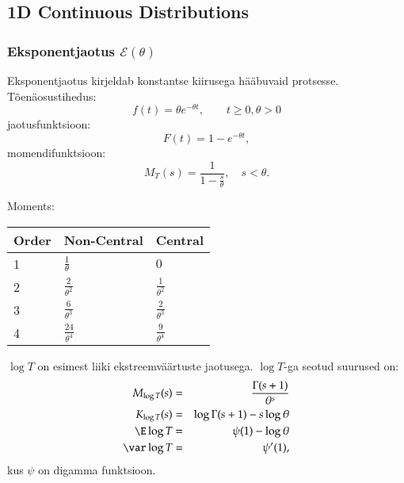 \documentclass[a4paper]{article}
\numberwithin{equation}{subsection}
\begin{document}
\subsection{1D Continuous Distributions}

\subsubsection{Eksponentjaotus $\mathcal{E}(\theta)$}
Eksponentjaotus kirjeldab konstantse kiirusega hääbuvaid protsesse.
Tõenäosustihedus:
\begin{equation}
f(t) = \theta e^{-\theta t}, \qquad t \ge 0, \theta > 0
\end{equation}
jaotusfunktsioon:
\begin{equation}
F(t) = 1 - e^{-\theta t},
\end{equation}
momendifunktsioon:
\begin{equation}
M_T (s) = \frac{1}{1-\frac{s}{\theta}}, \quad s<\theta.
\end{equation}

Moments:
\begin{center}
  \begin{tabular}{lll}
    \toprule
    Order & Non-Central & Central\\
    \midrule
    1 & $\displaystyle\frac{1}{\theta}$ & $0$ \\[1.4ex]
    2 & $\displaystyle\frac{2}{\theta^{2}}$ & $\displaystyle\frac{1}{\theta^{2}}$
    \\[1.4ex]
    3 & $\displaystyle \frac{6}{\theta^{3}}$  & $\displaystyle\frac{2}{\theta^{3}}$\\[1.3ex]
    4 & $\displaystyle \frac{24}{\theta^{4}}$ & $\displaystyle\frac{9}{\theta^{4}}$ \\
    \bottomrule
  \end{tabular}
\end{center}

$\log T$ on esimest liiki ekstreemväärtuste jaotusega. $\log T$-ga
seotud suurused on:
\begin{eqnarray}
M_{\log T} (s) &=& \frac{\Gamma(s+1)}{\theta^s}\\
K_{\log T} (s) &=& \log \Gamma(s+1) - s \log \theta\\
\E \log T &=& \psi(1) - \log \theta\\
\var \log T &=& \psi'(1),
\end{eqnarray}
kus $\psi$ on digamma funktsioon.
\end{document}
